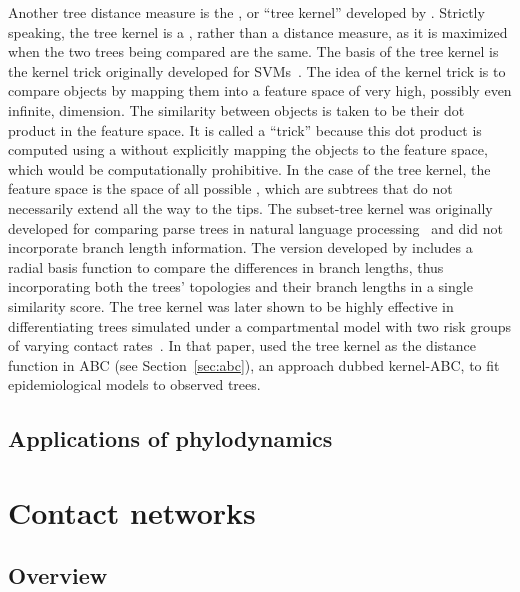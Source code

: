 Another tree distance measure is the , or ``tree
kernel'' developed by \textcite{poon2013mapping}. Strictly speaking, the tree
kernel is a , rather than a distance measure, as it is
maximized when the two trees being compared are the same. The basis of the tree
kernel is the kernel trick originally developed for
\glspl{SVM}~\autocite{burges1998tutorial}. The idea of the kernel trick is to
compare objects by mapping them into a feature space of very high, possibly
even infinite, dimension. The similarity between objects is taken to be their
dot product in the feature space. It is called a ``trick'' because this dot
product is computed using a  without explicitly mapping
the objects to the feature space, which would be computationally prohibitive. In
the case of the tree kernel, the feature space is the space of all possible
, which are subtrees that do not necessarily extend all the
way to the tips. The subset-tree kernel was originally developed for comparing
parse trees in natural language processing~\autocite{collins2002new} and did
not incorporate branch length information. The version developed by
\textcite{poon2013mapping} includes a radial basis function to compare the
differences in branch lengths, thus incorporating both the trees' topologies
and their branch lengths in a single similarity score. The tree kernel was
later shown to be highly effective in differentiating trees simulated under a
compartmental model with two risk groups of varying contact
rates~\autocite{poon2015phylodynamic}. In that paper,
\citeauthor{poon2015phylodynamic} used the tree kernel as the distance function
in \gls{ABC} (see Section~\ref{sec:abc}), an approach dubbed kernel-\gls{ABC},
to fit epidemiological models to observed trees.

\subsection{Applications of phylodynamics}
\label{subsubsec:appphylo}


\section{Contact networks}
\label{subsec:contactnet}

\subsection{Overview}

